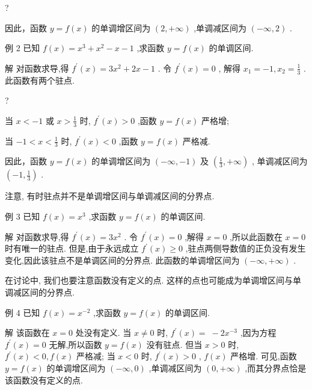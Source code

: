 \documentclass[10pt]{article}
\begin{document}
?

因此，函数 \(y = f\left( x\right)\) 的单调增区间为 \(\left( {2, + \infty }\right)\) ,单调减区间为 \(\left( {-\infty ,2}\right)\) .

例 2 已知 \(f\left( x\right)  = {x}^{3} + {x}^{2} - x - 1\) ,求函数 \(y = f\left( x\right)\) 的单调区间.

解 对函数求导,得 \({f}^{\prime }\left( x\right)  = 3{x}^{2} + {2x} - 1\) . 令 \({f}^{\prime }\left( x\right)  = 0\) , 解得 \({x}_{1} =  - 1,{x}_{2} = \frac{1}{3}\) . 此函数有两个驻点.

?

当 \(x <  - 1\) 或 \(x > \frac{1}{3}\) 时, \({f}^{\prime }\left( x\right)  > 0\) ,函数 \(y = f\left( x\right)\) 严格增;

当 \(- 1 < x < \frac{1}{3}\) 时, \({f}^{\prime }\left( x\right)  < 0\) ,函数 \(y = f\left( x\right)\) 严格减.

因此，函数 \(y = f\left( x\right)\) 的单调增区间为 \(\left( {-\infty , - 1}\right)\) 及 \(\left( {\frac{1}{3}, + \infty }\right)\) , 单调减区间为 \(\left( {-1,\frac{1}{3}}\right)\) .

注意, 有时驻点并不是单调增区间与单调减区间的分界点.

例 3 已知 \(f\left( x\right)  = {x}^{3}\) ,求函数 \(y = f\left( x\right)\) 的单调区间.

解 对函数求导,得 \({f}^{\prime }\left( x\right)  = 3{x}^{2}\) . 令 \({f}^{\prime }\left( x\right)  = 0\) ,解得 \(x = 0\) ,所以此函数在 \(x = 0\) 时有唯一的驻点. 但是,由于永远成立 \({f}^{\prime }\left( x\right)  \geq  0\) ,驻点两侧导数值的正负没有发生变化,因此该驻点不是单调区间的分界点. 此函数的单调增区间为 \(\left( {-\infty , + \infty }\right)\) .

在讨论中, 我们也要注意函数没有定义的点. 这样的点也可能成为单调增区间与单调减区间的分界点.

例 4 已知 \(f\left( x\right)  = {x}^{-2}\) ,求函数 \(y = f\left( x\right)\) 的单调区间.

解 该函数在 \(x = 0\) 处没有定义. 当 \(x \neq  0\) 时, \({f}^{\prime }\left( x\right)  = \; - 2{x}^{-3}\) ,因为方程 \({f}^{\prime }\left( x\right)  = 0\) 无解,所以函数 \(y = f\left( x\right)\) 没有驻点. 但当 \(x > 0\) 时, \({f}^{\prime }\left( x\right)  < 0,f\left( x\right)\) 严格减; 当 \(x < 0\) 时, \({f}^{\prime }\left( x\right)  > 0\) , \(f\left( x\right)\) 严格增. 可见,函数 \(y = f\left( x\right)\) 的单调增区间为 \(\left( {-\infty ,0}\right)\) ,单调减区间为 \(\left( {0, + \infty }\right)\) ,而其分界点恰是该函数没有定义的点.
\end{document}
